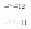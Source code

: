 








\chardef\dblcode=\catcode`\"	%
\catcode`\"=12			%

\chardef\atcode=\catcode`\@	%
\catcode`\@=11			%




